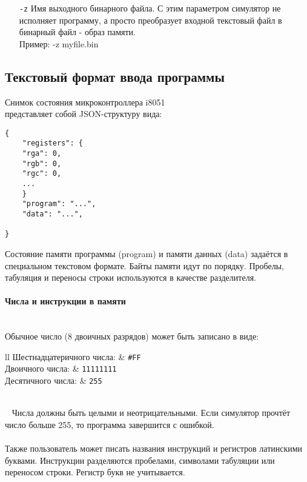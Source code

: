 \begin{enumerate}
	\item[{\tt\large -z}]
	Имя выходного бинарного файла.
	С этим параметром симулятор не исполняет программу, а просто преобразует входной текстовый файл в бинарный файл - образ памяти.\\
	Пример: -z myfile.bin
\end{enumerate}

\subsection{Текстовый формат ввода программы}
Снимок состояния микроконтроллера i8051 \\ представляет собой JSON-структуру вида:\\
\begin{lstlisting}
{
	"registers": {
	"rga": 0,
	"rgb": 0,
	"rgc": 0,
	...
	}
	"program": "...",
	"data": "...",
	
}
\end{lstlisting}
Состояние памяти программы (program) и памяти данных (data) задаётся в специальном текстовом формате.
Байты памяти идут по порядку. Пробелы, табуляция и переносы строки используются в качестве разделителя.

\paragraph{Числа и инструкции в памяти}~\\
Обычное число (8 двоичных разрядов) может быть записано в виде:
~
~\\[3mm]
\begin{tabular}{{l}{l}}
	Шестнадцатеричного числа: & {\tt\large \#FF} \\[2mm]
	Двоичного числа:          & {\tt\large 11111111} \\[2mm]
	Десятичного числа:        & {\tt\large *255} \\
\end{tabular} \\[3mm]
~
Числа должны быть целыми и неотрицательными. Если симулятор прочтёт число больше 255, то программа завершится с ошибкой.\\
~\\
Также пользователь может писать названия инструкций и регистров латинскими буквами. Инструкции разделяются пробелами, символами табуляции или переносом строки. Регистр букв не учитывается.\\

